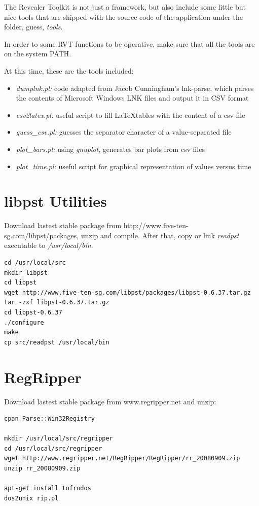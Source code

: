\documentclass[a4paper,11pt,oneside]{report}
\begin{document}
The Revealer Toolkit is not just a framework, but also include some little but nice tools that are shipped with the source code of the application under the folder, guess, \emph{tools}. 

In order to some RVT functions to be operative, make sure that all the tools are on the system PATH.

At this time, these are the tools included:

\begin{itemize}
\item \emph{dumplnk.pl:} code adapted from Jacob Cunningham's lnk-parse, which parses the contents of Microsoft Windows LNK files and output it in CSV format
\item \emph{csv2latex.pl:} useful script to fill \LaTeX tables with the content of a csv file
\item \emph{guess_csv.pl:} guesses the separator character of a value-separated file
\item \emph{plot_bars.pl:} using \emph{gnuplot}, generates bar plots from csv files
\item \emph{plot_time.pl:} useful script for graphical representation of values versus time
\end{itemize}




\section{libpst Utilities} \label{anx:libpst}

Download lastest stable package from http://www.five-ten-sg.com/libpst/packages, unzip and compile. After that, copy or link \emph{readpst} executable to \emph{/usr/local/bin}.

\begin{verbatim}
cd /usr/local/src
mkdir libpst
cd libpst
wget http://www.five-ten-sg.com/libpst/packages/libpst-0.6.37.tar.gz
tar -zxf libpst-0.6.37.tar.gz
cd libpst-0.6.37
./configure
make
cp src/readpst /usr/local/bin
\end{verbatim}



\section{RegRipper} \label{anx:regripper}

Download lastest stable package from www.regripper.net and unzip:

\begin{verbatim}
cpan Parse::Win32Registry

mkdir /usr/local/src/regripper
cd /usr/local/src/regripper
wget http://www.regripper.net/RegRipper/RegRipper/rr_20080909.zip
unzip rr_20080909.zip

apt-get install tofrodos
dos2unix rip.pl
\end{verbatim}
\end{document}
